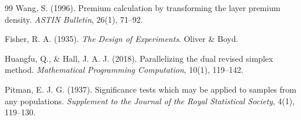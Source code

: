 \documentclass[11pt]{article}
\theoremstyle{remark}
\begin{document}
\begin{thebibliography}{99}
Wang, S. (1996).
Premium calculation by transforming the layer premium density.
\emph{ASTIN Bulletin}, 26(1), 71--92.

Fisher, R. A. (1935).
\emph{The Design of Experiments}.
Oliver \& Boyd.

Huangfu, Q., \& Hall, J. A. J. (2018).
Parallelizing the dual revised simplex method.
\emph{Mathematical Programming Computation}, 10(1), 119--142.

Pitman, E. J. G. (1937).
Significance tests which may be applied to samples from any populations.
\emph{Supplement to the Journal of the Royal Statistical Society}, 4(1), 119--130.

\end{thebibliography}
\end{document}
